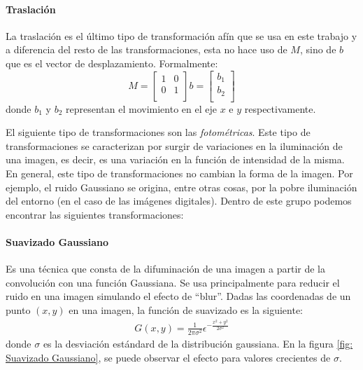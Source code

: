 		\paragraph{Traslación}		
			
			La traslación es el último tipo de transformación afín que se usa en este trabajo y a diferencia del resto de las transformaciones, esta no hace uso de $M$, sino de $b$ que es el vector de desplazamiento. Formalmente:
			\begin{equation*}
				M =  
					\begin{bmatrix}
						1 & 0 \\
						0 & 1  \\
					\end{bmatrix}
					b =
					\begin{bmatrix}
						b_1 \\
						b_2 \\
					\end{bmatrix}	
			\end{equation*}
		donde $b_1$ y $b_2$ representan el movimiento en el eje $x$ e $y$ respectivamente.
		
	El siguiente tipo de transformaciones son las \textit{fotométricas}. Este tipo de transformaciones se caracterizan por surgir de variaciones en la iluminación de una imagen, es decir, es una variación en la función de intensidad de la misma. En general, este tipo de transformaciones no cambian la forma de la imagen. Por ejemplo, el ruido Gaussiano se origina, entre otras cosas, por la pobre iluminación del entorno (en el caso de las imágenes digitales). Dentro de este grupo podemos encontrar las siguientes transformaciones:
		
		\paragraph{Suavizado Gaussiano}
		
			Es una técnica que consta de la difuminación de una imagen a partir de la convolución con una función Gaussiana. Se usa principalmente para reducir el ruido en una imagen simulando el efecto de ``blur''. Dadas las coordenadas de un punto $(x, y)$ en una imagen, la función de suavizado es la siguiente:
			\begin{align*}
				G(x,y) = \frac{1}{2\pi\sigma^2}\epsilon^{-\frac{x^2+y^2}{2\sigma^2}}
			\end{align*}
			donde $\sigma$ es la desviación estándard de la distribución gaussiana. En la figura \ref{fig: Suavizado Gaussiano}, se puede observar el efecto para valores crecientes de $\sigma$.
			
